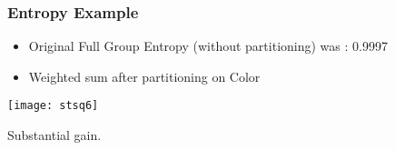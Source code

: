 \begin{frame}[fragile]\frametitle{Entropy Example}
\begin{itemize}
\item Original Full Group Entropy (without partitioning) was : 0.9997
\item Weighted sum after partitioning on Color
\end{itemize}
\begin{center}
\texttt{[image: stsq6]}
\end{center}
Substantial gain.
\end{frame}






